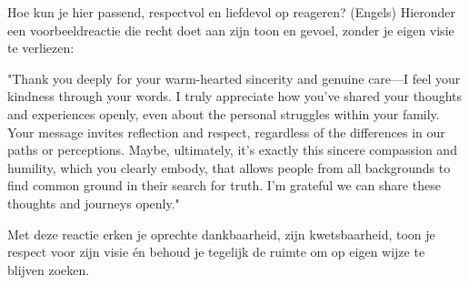 Hoe kun je hier passend, respectvol en liefdevol op reageren? (Engels)
Hieronder een voorbeeldreactie die recht doet aan zijn toon en gevoel, zonder je eigen visie te verliezen:

"Thank you deeply for your warm-hearted sincerity and genuine care—I feel your kindness through your words. I truly appreciate how you’ve shared your thoughts and experiences openly, even about the personal struggles within your family. Your message invites reflection and respect, regardless of the differences in our paths or perceptions. Maybe, ultimately, it’s exactly this sincere compassion and humility, which you clearly embody, that allows people from all backgrounds to find common ground in their search for truth. I'm grateful we can share these thoughts and journeys openly."

Met deze reactie erken je oprechte dankbaarheid, zijn kwetsbaarheid, toon je respect voor zijn visie én behoud je tegelijk de ruimte om op eigen wijze te blijven zoeken.
